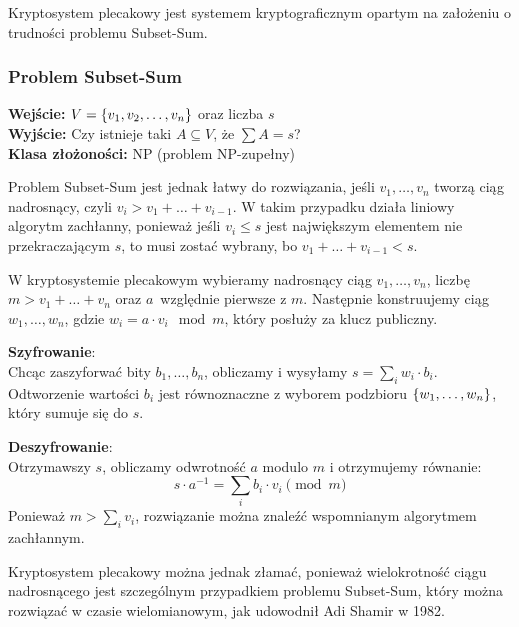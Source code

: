Kryptosystem plecakowy jest systemem kryptograficznym opartym na założeniu o trudności problemu Subset-Sum.

\subsubsection*{Problem Subset-Sum}
\textbf{Wejście:} \( V = \set{v_1, v_2, \dots, v_n} \) oraz liczba \( s \) \\
\textbf{Wyjście:} Czy istnieje taki \( A \subseteq V \), że \( \sum A = s \)? \\
\textbf{Klasa złożoności:} NP (problem NP-zupełny)

Problem Subset-Sum jest jednak łatwy do rozwiązania, jeśli \( v_1, \dots, v_n \) tworzą ciąg nadrosnący, czyli \( v_i > v_1 + \ldots + v_{i-1} \).
W takim przypadku działa liniowy algorytm zachłanny, ponieważ jeśli \( v_i \leq s \) jest największym elementem nie przekraczającym \( s \), to musi zostać wybrany, bo \( v_1 + \ldots + v_{i-1} < s \).

W kryptosystemie plecakowym wybieramy nadrosnący ciąg \( v_1, \dots, v_n \), liczbę \( m > v_1 + \ldots + v_n \) oraz \( a \)~względnie pierwsze z \( m \).
Następnie konstruujemy ciąg \( w_1, \dots, w_n \), gdzie \( w_i = a \cdot v_i \mod m \), który posłuży za klucz publiczny.

\textbf{Szyfrowanie}: \\
Chcąc zaszyforwać bity \( b_1, \dots, b_n \), obliczamy i wysyłamy \( s = \sum_i w_i \cdot b_i \). Odtworzenie wartości \( b_i \) jest równoznaczne z wyborem podzbioru \( \set{w_1, \ldots, w_n} \), który sumuje się do \( s \).

\textbf{Deszyfrowanie}: \\
Otrzymawszy \( s \), obliczamy odwrotność \( a \) modulo \( m \) i otrzymujemy równanie:
\[
    s \cdot a^{-1} = \sum_i b_i \cdot v_i \pmod{m}
\]
Ponieważ \( m > \sum_i v_i \), rozwiązanie można znaleźć wspomnianym algorytmem zachłannym.

Kryptosystem plecakowy można jednak złamać, ponieważ wielokrotność ciągu nadrosnącego jest szczególnym przypadkiem problemu Subset-Sum, który można rozwiązać w czasie wielomianowym, jak udowodnił Adi Shamir w 1982.